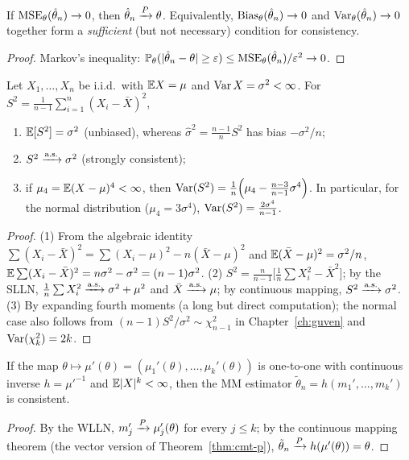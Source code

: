 \documentclass[main.tex]{subfiles}
\begin{document}
\begin{theorem}\label{thm:mse-tutarlilik}
If $\operatorname{MSE}_\theta(\hat\theta_n)\to0$, then $\hat\theta_n\xrightarrow{P}\theta$. Equivalently, $\operatorname{Bias}_\theta(\hat\theta_n)\to0$ and $\operatorname{Var}_\theta(\hat\theta_n)\to0$ together form a \emph{sufficient} (but not necessary) condition for consistency.
\end{theorem}
\begin{proof}
Markov's inequality: $\mathbb{P}_\theta(|\hat\theta_n-\theta|\ge\varepsilon)\le\operatorname{MSE}_\theta(\hat\theta_n)/\varepsilon^2\to0$.
\end{proof}

\begin{theorem}\label{thm:s2-yansiz}
Let $X_1,\dots,X_n$ be i.i.d.\ with $\mathbb{E} X=\mu$ and $\operatorname{Var} X=\sigma^2<\infty$. For $S^2=\frac{1}{n-1}\sum_{i=1}^n(X_i-\bar X)^2$,
\begin{enumerate}
  \item $\mathbb{E}[S^2]=\sigma^2$ (unbiased), whereas $\hat\sigma^2=\frac{n-1}{n}S^2$ has bias $-\sigma^2/n$;
  \item $S^2\xrightarrow{\text{a.s.}}\sigma^2$ (strongly consistent);
  \item if $\mu_4=\mathbb{E}(X-\mu)^4<\infty$, then $\operatorname{Var}(S^2)=\frac1n\Big(\mu_4-\frac{n-3}{n-1}\sigma^4\Big)$. In particular, for the normal distribution ($\mu_4=3\sigma^4$), $\operatorname{Var}(S^2)=\frac{2\sigma^4}{n-1}$.
\end{enumerate}
\end{theorem}
\begin{proof}
(1) From the algebraic identity $\sum(X_i-\bar X)^2=\sum(X_i-\mu)^2-n(\bar X-\mu)^2$ and $\mathbb{E}(\bar X-\mu)^2=\sigma^2/n$, $\mathbb{E}\sum(X_i-\bar X)^2=n\sigma^2-\sigma^2=(n-1)\sigma^2$.
(2) $S^2=\frac{n}{n-1}\Big[\frac1n\sum X_i^2-\bar X^2\Big]$; by the SLLN, $\frac1n\sum X_i^2\xrightarrow{\text{a.s.}}\sigma^2+\mu^2$ and $\bar X\xrightarrow{\text{a.s.}}\mu$; by continuous mapping, $S^2\xrightarrow{\text{a.s.}}\sigma^2$.
(3) By expanding fourth moments (a long but direct computation); the normal case also follows from $(n-1)S^2/\sigma^2\sim\chi^2_{n-1}$ in Chapter~\ref{ch:guven} and $\operatorname{Var}(\chi^2_k)=2k$.
\end{proof}

\begin{theorem}\label{thm:mm-tutarli}
If the map $\theta\mapsto\mu'(\theta)=(\mu_1'(\theta),\dots,\mu_k'(\theta))$ is one-to-one with continuous inverse $h=\mu'^{-1}$ and $\mathbb{E}|X|^k<\infty$, then the MM estimator $\tilde\theta_n=h(m_1',\dots,m_k')$ is consistent.
\end{theorem}
\begin{proof}
By the WLLN, $m_j'\xrightarrow{P}\mu_j'(\theta)$ for every $j\le k$; by the continuous mapping theorem (the vector version of Theorem~\ref{thm:cmt-p}), $\tilde\theta_n\xrightarrow{P} h(\mu'(\theta))=\theta$.
\end{proof}
\end{document}
